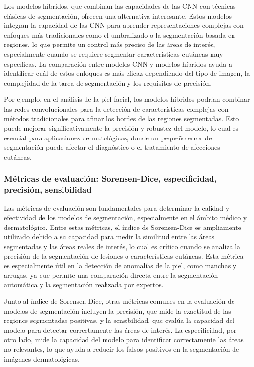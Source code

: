 Los modelos híbridos, que combinan las capacidades de las CNN con técnicas clásicas de segmentación, ofrecen una alternativa interesante. Estos modelos integran la capacidad de las CNN para aprender representaciones complejas con enfoques más tradicionales como el umbralizado o la segmentación basada en regiones, lo que permite un control más preciso de las áreas de interés, especialmente cuando se requiere segmentar características cutáneas muy específicas. La comparación entre modelos CNN y modelos híbridos ayuda a identificar cuál de estos enfoques es más eficaz dependiendo del tipo de imagen, la complejidad de la tarea de segmentación y los requisitos de precisión.

Por ejemplo, en el análisis de la piel facial, los modelos híbridos podrían combinar las redes convolucionales para la detección de características complejas con métodos tradicionales para afinar los bordes de las regiones segmentadas. Esto puede mejorar significativamente la precisión y robustez del modelo, lo cual es esencial para aplicaciones dermatológicas, donde un pequeño error de segmentación puede afectar el diagnóstico o el tratamiento de afecciones cutáneas. \parencite{hussain2021}

\subsubsection{Métricas de evaluación: Sorensen-Dice, especificidad, precisión, sensibilidad}
Las métricas de evaluación son fundamentales para determinar la calidad y efectividad de los modelos de segmentación, especialmente en el ámbito médico y dermatológico. Entre estas métricas, el índice de Sorensen-Dice es ampliamente utilizado debido a su capacidad para medir la similitud entre las áreas segmentadas y las áreas reales de interés, lo cual es crítico cuando se analiza la precisión de la segmentación de lesiones o características cutáneas. Esta métrica es especialmente útil en la detección de anomalías de la piel, como manchas y arrugas, ya que permite una comparación directa entre la segmentación automática y la segmentación realizada por expertos.

Junto al índice de Sorensen-Dice, otras métricas comunes en la evaluación de modelos de segmentación incluyen la precisión, que mide la exactitud de las regiones segmentadas positivas, y la sensibilidad, que evalúa la capacidad del modelo para detectar correctamente las áreas de interés. La especificidad, por otro lado, mide la capacidad del modelo para identificar correctamente las áreas no relevantes, lo que ayuda a reducir los falsos positivos en la segmentación de imágenes dermatológicas. \parencite{sorensen1948}

